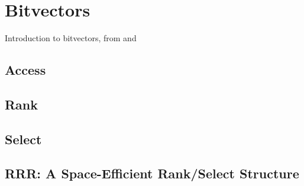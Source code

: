 \section{Bitvectors}

Introduction to bitvectors, from \cite{ferragina2023pearls} and \cite{navarro2016compact}

\subsection{Access}
\subsection{Rank}
\subsection{Select}
\subsection{RRR: A Space-Efficient Rank/Select Structure}
